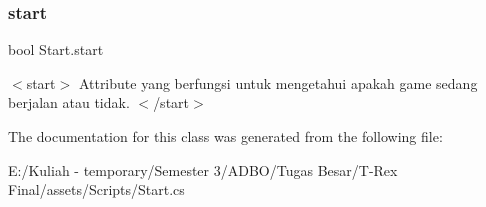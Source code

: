 \subsubsection{\texorpdfstring{start}{start}}
{\footnotesize\ttfamily bool Start.\+start}

$<$start$>$ Attribute yang berfungsi untuk mengetahui apakah game sedang berjalan atau tidak. $<$/start$>$ 

The documentation for this class was generated from the following file\+:\begin{DoxyCompactItemize}
\item 
E\+:/\+Kuliah -\/ temporary/\+Semester 3/\+A\+D\+B\+O/\+Tugas Besar/\+T-\/\+Rex Final/assets/\+Scripts/Start.\+cs\end{DoxyCompactItemize}

